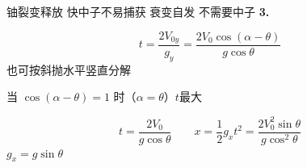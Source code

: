 铀裂变释放 快中子不易捕获 衰变自发 不需要中子 %
\textbf{3.}

\[ t=\frac{2V_{0y}}{g_y}=\frac{2V_0\cos(\alpha-\theta)}{g\cos\theta} \]
也可按斜抛水平竖直分解

当 $\cos(\alpha-\theta)=1$ 时（$\alpha=\theta$）$t$最大

\[ t=\frac{2V_0}{g\cos\theta}\qquad x=\frac12 g_xt^{2}=\frac{2V_0^{2}\sin\theta}{g\cos^{2}\theta} \]
$g_x=g\sin\theta$
